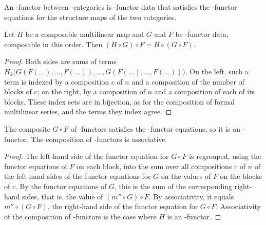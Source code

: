 \begin{definition}
\label{AInfinityTheory.AInfinityFunctor}
\leanok
{}
An \Ainf{}-functor between \Ainf{}-categories is \Ainf{}-functor data that
satisfies the \Ainf{}-functor equations for the structure maps of the two
categories.
\end{definition}

\begin{theorem}
\label{AInfinityTheory.ComposableMultilinearMap.comp_assoc}
\leanok
{}
Let $H$ be a composable multilinear map and $G$ and $F$ be \Ainf{}-functor data, composable in
this order. Then $(H \circ G) \circ F = H \circ (G \circ F)$.
\end{theorem}

\begin{proof}
\leanok
Both sides are sums of terms
$H_k\bigl(G(F(\dots),\dots,F(\dots)),\dots,G(F(\dots),\dots,F(\dots))\bigr)$. On the left, such a
term is indexed by a composition $c$ of $n$ and a composition of the number of blocks of $c$; on
the right, by a composition of $n$ and a composition of each of its blocks. These index sets are
in bijection, as for the composition of formal multilinear series, and the terms they index
agree.
\end{proof}

\begin{theorem}
\label{AInfinityTheory.AInfinityFunctor.comp}
\leanok
{}
The composite $G \circ F$ of \Ainf{}-functors satisfies the \Ainf{}-functor equations, so it is an
\Ainf{}-functor. The composition of \Ainf{}-functors is associative.
\end{theorem}

\begin{proof}
\leanok
The left-hand side of the functor equation for $G \circ F$ is regrouped, using the functor
equations of $F$ on each block, into the sum over all compositions $c$ of $n$ of the left-hand
sides of the functor equations for $G$ on the values of $F$ on the blocks of $c$. By the functor
equations of $G$, this is the sum of the corresponding right-hand sides, that is, the value of
$(m'' \circ G) \circ F$. By associativity, it equals $m'' \circ (G \circ F)$, the right-hand side
of the functor equation for $G \circ F$. Associativity of the composition of \Ainf{}-functors is
the case where $H$ is an \Ainf{}-functor.
\end{proof}
